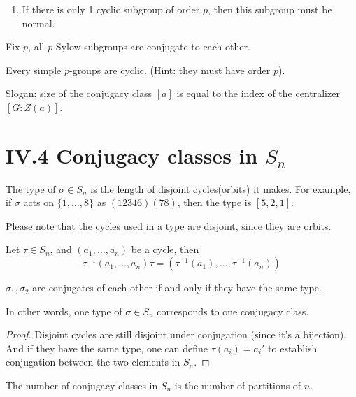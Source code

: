 \begin{example}
    \begin{enumerate}
        \item If there is only 1 cyclic subgroup of order $p$, then this subgroup must be normal.
    \end{enumerate}
\end{example}

\begin{thm}
    Fix $p$, all $p$-Sylow subgroups are conjugate to each other.
\end{thm}

\begin{example}
    Every simple $p$-groups are cyclic. (Hint: they must have order $p$).
\end{example}


Slogan: size of the conjugacy class $[a]$ is equal to the index of the centralizer $[G: Z(a)]$.

\section{IV.4 Conjugacy classes in $S_n$}
\begin{defn}[type]
    The type of $\sigma\in S_n$ is the length of disjoint cycles(orbits) it makes. For example, if $\sigma$ acts on $\{1, \ldots, 8\}$ as $(12346)(78)$, then the type is $[5,2,1]$.

    Please note that the cycles used in a type are disjoint, since they are orbits.
\end{defn}
\begin{prop}
    Let $\tau\in S_n$, and $(a_1, \ldots, a_n)$ be a cycle, then
    \begin{equation*}
        \tau^{-1}(a_1, \ldots, a_n)\tau=(\tau^{-1}(a_1),\dots, \tau^{-1}(a_n))
    \end{equation*}
\end{prop}
\begin{thm}
    $\sigma_1, \sigma_2$ are conjugates of each other if and only if they have the same type.

    In other words, one type of $\sigma\in S_n$ corresponds to one conjugacy class.
\end{thm}
\begin{proof}
    Disjoint cycles are still disjoint under conjugation (since it's a bijection). And if they have the same type, one can define $\tau(a_i)=a_i'$ to establish conjugation between the two elements in $S_n$.
\end{proof}
\begin{thm}[Conjugacy in $S_n$]
    The number of conjugacy classes in $S_n$ is the number of partitions of $n$.
\end{thm}

